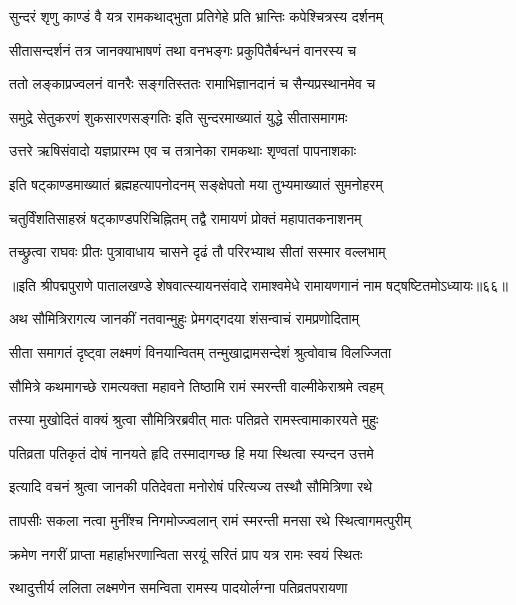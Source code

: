 \twolineshloka
{सुन्दरं शृणु काण्डं वै यत्र रामकथाद्भुता}
{प्रतिगेहे प्रति भ्रान्तिः कपेश्चित्रस्य दर्शनम्}%

\twolineshloka
{सीतासन्दर्शनं तत्र जानक्याभाषणं तथा}
{वनभङ्गः प्रकुपितैर्बन्धनं वानरस्य च}%

\twolineshloka
{ततो लङ्काप्रज्वलनं वानरैः सङ्गतिस्ततः}
{रामाभिज्ञानदानं च सैन्यप्रस्थानमेव च}%

\twolineshloka
{समुद्रे सेतुकरणं शुकसारणसङ्गतिः}
{इति सुन्दरमाख्यातं युद्धे सीतासमागमः}%

\twolineshloka
{उत्तरे ऋषिसंवादो यज्ञप्रारम्भ एव च}
{तत्रानेका रामकथाः शृण्वतां पापनाशकाः}%

\twolineshloka
{इति षट्काण्डमाख्यातं ब्रह्महत्यापनोदनम्}
{सङ्क्षेपतो मया तुभ्यमाख्यातं सुमनोहरम्}%

\twolineshloka
{चतुर्विंशतिसाहस्रं षट्काण्डपरिचिह्नितम्}
{तद्वै रामायणं प्रोक्तं महापातकनाशनम्}%

\twolineshloka
{तच्छ्रुत्वा राघवः प्रीतः पुत्रावाधाय चासने}
{दृढं तौ परिरभ्याथ सीतां सस्मार वल्लभाम्}%

॥इति श्रीपद्मपुराणे पातालखण्डे शेषवात्स्यायनसंवादे रामाश्वमेधे रामायणगानं नाम षट्षष्टितमोऽध्यायः॥६६॥



\twolineshloka
{अथ सौमित्रिरागत्य जानकीं नतवान्मुहुः}
{प्रेमगद्गदया शंसन्वाचं रामप्रणोदिताम्}%

\twolineshloka
{सीता समागतं दृष्ट्वा लक्ष्मणं विनयान्वितम्}
{तन्मुखाद्रामसन्देशं श्रुत्वोवाच विलज्जिता}%

\twolineshloka
{सौमित्रे कथमागच्छे रामत्यक्ता महावने}
{तिष्ठामि रामं स्मरन्ती वाल्मीकेराश्रमे त्वहम्}%

\twolineshloka
{तस्या मुखोदितं वाक्यं श्रुत्वा सौमित्रिरब्रवीत्}
{मातः पतिव्रते रामस्त्वामाकारयते मुहुः}%

\twolineshloka
{पतिव्रता पतिकृतं दोषं नानयते हृदि}
{तस्मादागच्छ हि मया स्थित्वा स्यन्दन उत्तमे}%

\twolineshloka
{इत्यादि वचनं श्रुत्वा जानकी पतिदेवता}
{मनोरोषं परित्यज्य तस्थौ सौमित्रिणा रथे}%

\twolineshloka
{तापसीः सकला नत्वा मुनींश्च निगमोज्ज्वलान्}
{रामं स्मरन्ती मनसा रथे स्थित्वागमत्पुरीम्}%

\twolineshloka
{क्रमेण नगरीं प्राप्ता महार्हाभरणान्विता}
{सरयूं सरितं प्राप यत्र रामः स्वयं स्थितः}%

\twolineshloka
{रथादुत्तीर्य ललिता लक्ष्मणेन समन्विता}
{रामस्य पादयोर्लग्ना पतिव्रतपरायणा}%


